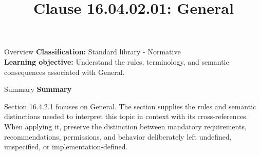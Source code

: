 \documentclass[10pt,letterpaper]{article}
\title{Clause 16.04.02.01: General}
\author{}
\date{}
\begin{document}
\maketitle
\begin{CornellOverviewBox}{Overview}
\textbf{Classification:} Standard library - Normative\\[2pt]
\textbf{Learning objective:} Understand the rules, terminology, and semantic consequences associated with General.
\end{CornellOverviewBox}\begin{CornellSummaryBox}{Summary}
{\sffamily\bfseries\color{Accent} Summary}\par\vspace{3pt}Section 16.4.2.1 focuses on General. The section supplies the rules and semantic distinctions needed to interpret this topic in context with its cross-references. When applying it, preserve the distinction between mandatory requirements, recommendations, permissions, and behavior deliberately left undefined, unspecified, or implementation-defined.
\end{CornellSummaryBox}
\end{document}
